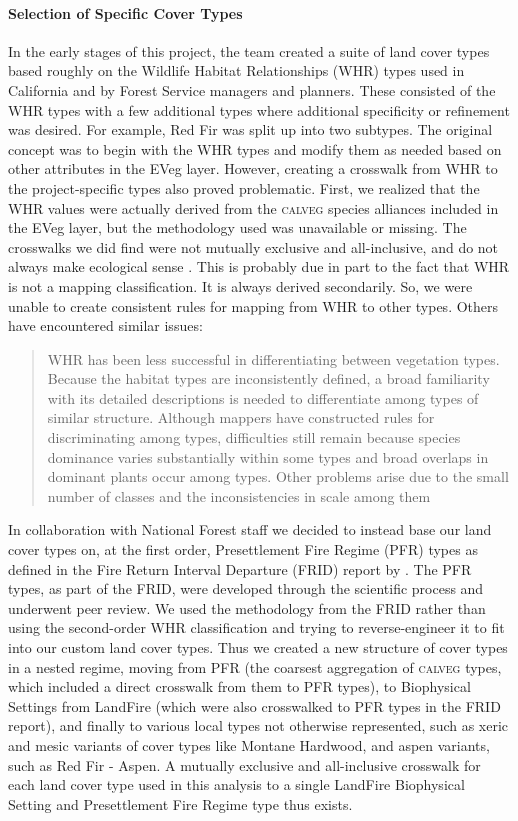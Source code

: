 \paragraph{Selection of Specific Cover Types}
In the early stages of this project, the team created a suite of land cover types based roughly on the Wildlife Habitat Relationships (WHR) types used in California and by Forest Service managers and planners. These consisted of the WHR types with a few additional types where additional specificity or refinement was desired. For example, Red Fir was split up into two subtypes. The original concept was to begin with the WHR types and modify them as needed based on other attributes in the EVeg layer. However, creating a crosswalk from WHR to the project-specific types also proved problematic. First, we realized that the WHR values were actually derived from the \textsc{calveg} species alliances included in the EVeg layer, but the methodology used was unavailable or missing. The crosswalks we did find were not mutually exclusive and all-inclusive, and do not always make ecological sense \citep{Keeler-Wolf2007,DeBecker1988,Game2005}. This is probably due in part to the fact that WHR is not a mapping classification. It is always derived secondarily. So, we were unable to create consistent rules for mapping from WHR to other types. Others have encountered similar issues:
%
\begin{quote}
WHR has been less successful in differentiating between vegetation types. Because the habitat types are inconsistently defined, a broad familiarity with its detailed descriptions is needed to differentiate among types of similar structure. Although mappers have constructed rules for discriminating among types, difficulties still remain because species dominance varies substantially within some types and broad overlaps in dominant plants occur among types. Other problems arise due to the small number of classes and the inconsistencies in scale among them \citep[p.~23]{Keeler-Wolf2007}
\end{quote}
%
In collaboration with National Forest staff we decided to instead base our land cover types on, at the first order, Presettlement Fire Regime (PFR) types as defined in the Fire Return Interval Departure (FRID) report by \citet{VandeWater2011}. The PFR types, as part of the FRID, were developed through the scientific process and underwent peer review. We used the methodology from the FRID rather than using the second-order WHR classification and trying to reverse-engineer it to fit into our custom land cover types. Thus we created a new structure of cover types in a nested regime, moving from PFR (the coarsest aggregation of \textsc{calveg} types, which included a direct crosswalk from them to PFR types), to Biophysical Settings from LandFire (which were also crosswalked to PFR types in the FRID report), and finally to various local types not otherwise represented, such as xeric and mesic variants of cover types like Montane Hardwood, and aspen variants, such as Red Fir - Aspen. A mutually exclusive and all-inclusive crosswalk for each land cover type used in this analysis to a single LandFire Biophysical Setting and Presettlement Fire Regime type thus exists.

